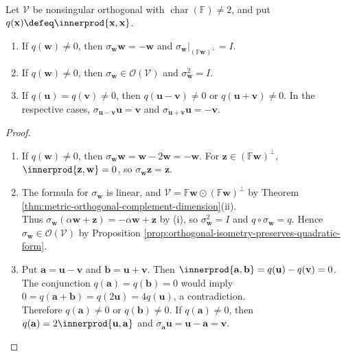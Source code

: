 \begin{proposition} \label{prop:symmetry-matches-equal-length-nonisotropic-vectors} \\
Let $\mathcal{V}$ be nonsingular orthogonal with $\operatorname{char}(\mathbb{F})\neq2$, and put $q(\mathbf{x})\defeq\innerprod{\mathbf{x},\mathbf{x}}$.
\begin{enumerate}[label=(\roman*)]
\setlength{\itemsep}{0pt}
\item If $q(\mathbf{w})\neq0$, then $\sigma_{\mathbf{w}}\mathbf{w}=-\mathbf{w}$ and $\sigma_{\mathbf{w}}|_{(\mathbb{F}\mathbf{w})^{\perp}}=I$.
\item If $q(\mathbf{w})\neq0$, then $\sigma_{\mathbf{w}}\in\mathcal{O}(\mathcal{V})$ and $\sigma_{\mathbf{w}}^2=I$.
\item If $q(\mathbf{u})=q(\mathbf{v})\neq0$, then $q(\mathbf{u}-\mathbf{v})\neq0$ or $q(\mathbf{u}+\mathbf{v})\neq0$. In the respective cases, $\sigma_{\mathbf{u}-\mathbf{v}}\mathbf{u}=\mathbf{v}$ and $\sigma_{\mathbf{u}+\mathbf{v}}\mathbf{u}=-\mathbf{v}$.
\end{enumerate}
\begin{proof}
\begin{enumerate}[label=(\roman*)]
\setlength{\itemsep}{0pt}
\item If $q(\mathbf{w})\neq0$, then $\sigma_{\mathbf{w}}\mathbf{w}=\mathbf{w}-2\mathbf{w}=-\mathbf{w}$. For $\mathbf{z}\in(\mathbb{F}\mathbf{w})^{\perp}$, $\innerprod{\mathbf{z},\mathbf{w}}=0$, so $\sigma_{\mathbf{w}}\mathbf{z}=\mathbf{z}$.
\item The formula for $\sigma_{\mathbf{w}}$ is linear, and $\mathcal{V}=\mathbb{F}\mathbf{w}\odot(\mathbb{F}\mathbf{w})^{\perp}$ by Theorem \ref{thm:metric-orthogonal-complement-dimension}(ii).\\
Thus $\sigma_{\mathbf{w}}(\alpha\mathbf{w}+\mathbf{z})=-\alpha\mathbf{w}+\mathbf{z}$ by (i), so $\sigma_{\mathbf{w}}^2=I$ and $q\circ\sigma_{\mathbf{w}}=q$. Hence $\sigma_{\mathbf{w}}\in\mathcal{O}(\mathcal{V})$ by Proposition \ref{prop:orthogonal-isometry-preserves-quadratic-form}.
\item Put $\mathbf{a}=\mathbf{u}-\mathbf{v}$ and $\mathbf{b}=\mathbf{u}+\mathbf{v}$. Then $\innerprod{\mathbf{a},\mathbf{b}}=q(\mathbf{u})-q(\mathbf{v})=0$.\\
The conjunction $q(\mathbf{a})=q(\mathbf{b})=0$ would imply $0=q(\mathbf{a}+\mathbf{b})=q(2\mathbf{u})=4q(\mathbf{u})$, a contradiction.\\
Therefore $q(\mathbf{a})\neq0$ or $q(\mathbf{b})\neq0$. If $q(\mathbf{a})\neq0$, then $q(\mathbf{a})=2\innerprod{\mathbf{u},\mathbf{a}}$ and $\sigma_{\mathbf{a}}\mathbf{u}=\mathbf{u}-\mathbf{a}=\mathbf{v}$.\\

\end{enumerate}
\end{proof}
\end{proposition}
